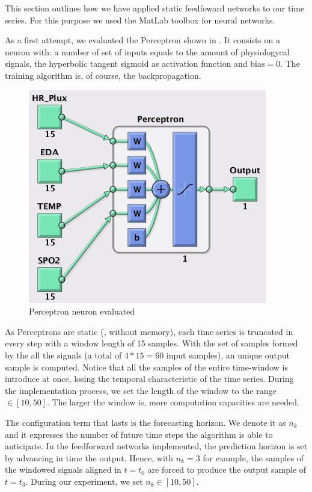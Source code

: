 \label{sec:application:feedforward}

This section outlines how we have applied static feedfoward networks to our time series. For this purpose we used the MatLab toolbox for neural networks.

As a first attempt, we evaluated the Perceptron shown in . 
It consists on a neuron with:
a number of set of inputs equals to the amount of physiologycal signals,
the hyperbolic tangent sigmoid as activation function
and $\text{bias}=0$. The training algorithm is, of course, the backpropagation.
\begin{figure}[!ht]
\centering
\includegraphics[width=0.5\columnwidth]{images/results/perceptronnn}
\caption{Perceptron neuron evaluated}
\label{fig:perceptronbuildt}
\end{figure}

As Perceptrons are static (\ie, without memory), each time series is truncated in every step with a window length of 15 samples. 
With the set of samples formed by the all the signals (a total of $4*15=60$ input samples), an unique output sample is computed. Notice that all the samples of the entire time-window is introduce at once, losing the temporal characteristic of the time series. During the implementation process, we set the length of the window to the range $\in [10,50]$. The larger the window is, more computation capacities are needed.

The configuration term that lasts is the forecasting horizon. We denote it as $n_{k}$ and it expresses the number of future time steps the algorithm is able to anticipate.
In the feedforward networks implemented, the prediction horizon is set by advancing in time the output. 
Hence, with $n_{k}=3$ for example, the samples of the windowed signals aligned in $t=t_{0}$ are forced to produce the output sample of $t=t_{3}$.
During our experiment, we set $n_{k}\in [10,50]$. 


